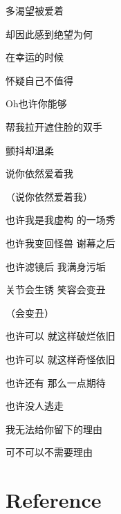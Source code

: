 \documentclass[]{ctexbook}
\begin{document}
多渴望被爱着

却因此感到绝望为何

在幸运的时候

怀疑自己不值得

Oh也许你能够

帮我拉开遮住脸的双手

颤抖却温柔

说你依然爱着我

（说你依然爱着我）

也许我是我虚构 的一场秀

也许我变回怪兽 谢幕之后

也许滤镜后 我满身污垢

关节会生锈 笑容会变丑

（会变丑）

也许可以 就这样破烂依旧

也许可以 就这样奇怪依旧

也许还有 那么一点期待

也许没人逃走

我无法给你留下的理由

可不可以不需要理由

\chapter*{Reference}\label{reference}




\backmatter
\printindex
\end{document}

